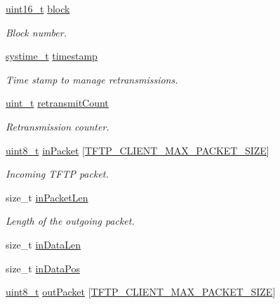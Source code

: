 \begin{DoxyCompactItemize}
\hyperlink{stdint_8h_a273cf69d639a59973b6019625df33e30}{uint16\+\_\+t} \hyperlink{structTftpClientContext_aa037821215c331f9c226c9c076951d3a}{block}
\begin{DoxyCompactList}\small\item\em Block number. \end{DoxyCompactList}\item 
\hyperlink{compiler__port_8h_ae3e32a98d431a02106616da3071832dd}{systime\+\_\+t} \hyperlink{structTftpClientContext_a3f3e170f2e6bbde98ca73a0526fee76c}{timestamp}
\begin{DoxyCompactList}\small\item\em Time stamp to manage retransmissions. \end{DoxyCompactList}\item 
\hyperlink{compiler__port_8h_a12a1e9b3ce141648783a82445d02b58d}{uint\+\_\+t} \hyperlink{structTftpClientContext_a553a66049549f947eb23fbe419dea373}{retransmit\+Count}
\begin{DoxyCompactList}\small\item\em Retransmission counter. \end{DoxyCompactList}\item 
\hyperlink{stdint_8h_aba7bc1797add20fe3efdf37ced1182c5}{uint8\+\_\+t} \hyperlink{structTftpClientContext_a0eaff236dc4e0bd3455850e76f39a05d}{in\+Packet} \mbox{[}\hyperlink{tftp__client_8h_a2afd441851cee2c32c2a02ea2e24c9e0}{T\+F\+T\+P\+\_\+\+C\+L\+I\+E\+N\+T\+\_\+\+M\+A\+X\+\_\+\+P\+A\+C\+K\+E\+T\+\_\+\+S\+I\+ZE}\mbox{]}
\begin{DoxyCompactList}\small\item\em Incoming T\+F\+TP packet. \end{DoxyCompactList}\item 
size\+\_\+t \hyperlink{structTftpClientContext_aa62bd41626a19d4eaea1fb61be425304}{in\+Packet\+Len}
\begin{DoxyCompactList}\small\item\em Length of the outgoing packet. \end{DoxyCompactList}\item 
size\+\_\+t \hyperlink{structTftpClientContext_a8d192f64cb73d6fa578e23c8171fee91}{in\+Data\+Len}
\item 
size\+\_\+t \hyperlink{structTftpClientContext_aad31a283211290004f2c304b4e33814c}{in\+Data\+Pos}
\item 
\hyperlink{stdint_8h_aba7bc1797add20fe3efdf37ced1182c5}{uint8\+\_\+t} \hyperlink{structTftpClientContext_ad79208d8abaf2c5e951c01f072b5c6e6}{out\+Packet} \mbox{[}\hyperlink{tftp__client_8h_a2afd441851cee2c32c2a02ea2e24c9e0}{T\+F\+T\+P\+\_\+\+C\+L\+I\+E\+N\+T\+\_\+\+M\+A\+X\+\_\+\+P\+A\+C\+K\+E\+T\+\_\+\+S\+I\+ZE}\mbox{]}

\end{DoxyCompactItemize}
